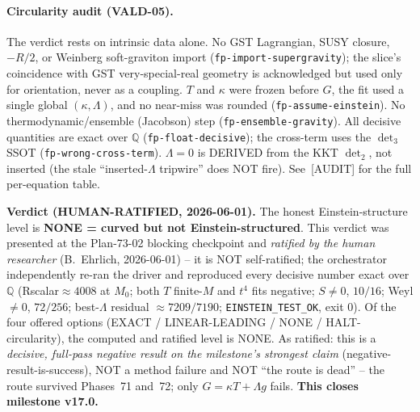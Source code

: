\paragraph{Circularity audit (VALD-05).} The verdict rests on intrinsic data alone. No
GST Lagrangian, SUSY closure, $-R/2$, or Weinberg soft-graviton import
(\texttt{fp-import-supergravity}); the slice's coincidence with GST very-special-real
geometry is acknowledged but used only for orientation, never as a coupling. $T$ and
$\kappa$ were frozen before $G$, the fit used a single global $(\kappa,\Lambda)$, and no
near-miss was rounded (\texttt{fp-assume-einstein}). No thermodynamic/ensemble (Jacobson)
step (\texttt{fp-ensemble-gravity}). All decisive quantities are exact over $\mathbb{Q}$
(\texttt{fp-float-decisive}); the cross-term uses the $\det_3$ SSOT
(\texttt{fp-wrong-cross-term}). $\Lambda=0$ is DERIVED from the KKT $\det_2$, not inserted
(the stale ``inserted-$\Lambda$ tripwire'' does NOT fire). See~[AUDIT] for the full
per-equation table.

\medskip
\noindent\textbf{Verdict (HUMAN-RATIFIED, 2026-06-01).} The honest Einstein-structure
level is \textbf{NONE = curved but not Einstein-structured}. This verdict was presented at
the Plan-73-02 blocking checkpoint and \emph{ratified by the human researcher} (B.~Ehrlich,
2026-06-01) -- it is NOT self-ratified; the orchestrator independently re-ran the driver
and reproduced every decisive number exact over $\mathbb{Q}$ (Rscalar$\approx4008$ at
$M_0$; both $T$ finite-$M$ and $t^4$ fits negative; $S\neq0$, $10/16$; Weyl $\neq0$,
$72/256$; best-$\Lambda$ residual $\approx7209/7190$; \texttt{EINSTEIN\_TEST\_OK}, exit 0).
Of the four offered options (EXACT / LINEAR-LEADING / NONE / HALT-circularity), the
computed and ratified level is NONE. As ratified: this is a \emph{decisive, full-pass
negative result on the milestone's strongest claim} (negative-result-is-success), NOT a
method failure and NOT ``the route is dead'' -- the route survived Phases~71 and~72; only
$G=\kappa T+\Lambda g$ fails. \textbf{This closes milestone v17.0.}
